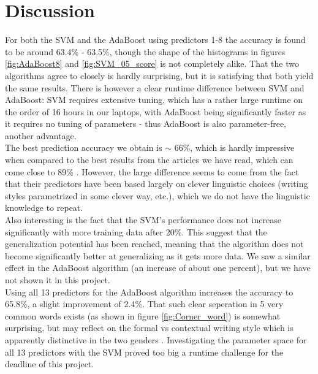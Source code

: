 \documentclass[a4paper,11pt]{article}
\begin{document}
\section{Discussion}
\noindent For both the SVM and the AdaBoost using predictors 1-8 the accuracy is found to be around 63.4\% - 63.5\%, though the shape of the histograms in figures \ref{fig:AdaBoost8} and \ref{fig:SVM_05_score} is not completely alike. That the two algorithms agree to closely is hardly surprising, but it is satisfying that both yield the same results. There is however a clear runtime difference between SVM and AdaBoost: SVM requires extensive tuning, which has a rather large runtime on the order of 16 hours in our laptops, with AdaBoost being significantly faster as it requires no tuning of parameters - thus AdaBoost is also parameter-free, another advantage.\\

\noindent The best prediction accuracy we obtain is $\sim$ 66\%, which is hardly impressive when compared to the best results from the articles we have read, which can come close to 89\% \cite{other}. However, the large difference seems to come from the fact that their predictors have been based largely on clever linguistic choices (writing styles parametrized in some clever way, etc.), which we do not have the linguistic knowledge to repeat.\\

\noindent Also interesting is the fact that the SVM's performance does not increase significantly with more training data after 20\%. This suggest that the generalization potential has been reached, meaning that the algorithm does not become significantly better at generalizing as it gets more data.
We saw a similar effect in the AdaBoost algorithm (an increase of about one percent), but we have not shown it in this project.\\

\noindent Using all 13 predictors for the AdaBoost algorithm increases the accuracy to 65.8\%, a slight improvement of 2.4\%. That such clear seperation in 5 very common words exists (as shown in figure \ref{fig:Corner_word}) is somewhat surprising, but may reflect on the formal vs contextual writing style which is apparently distinctive in the two genders \cite{data}. Investigating the parameter space for all 13 predictors with the SVM proved too big a runtime challenge for the deadline of this project.
\end{document}
